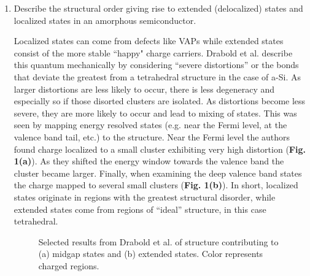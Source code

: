 \documentclass[12pt]{elsarticle}
\newcommand{\vs}{\vspace{2mm}}
\newcommand{\fullline}{\noindent\rule{14cm}{0.4pt} \vspace{4mm}}
\begin{document}
\begin{enumerate}
\fullline
\item Describe the structural order giving rise to extended (delocalized) states and localized states in an amorphous semiconductor. \par \vs 

Localized states can come from defects like VAPs while extended states consist of the more stable ``happy" charge carriers. Drabold et al. \cite{Drabold2000} describe this quantum mechanically by considering ``severe distortions'' or the bonds that deviate the greatest from a tetrahedral structure in the case of a-Si. As larger distortions are less likely to occur, there is less degeneracy and especially so if those disorted clusters are isolated. As distortions become less severe, they are more likely to occur and lead to mixing of states. This was seen by mapping energy resolved states (e.g. near the Fermi level, at the valence band tail, etc.) to the structure. Near the Fermi level the authors found charge localized to a small cluster exhibiting very high distortion (\textbf{Fig. 1(a)}). As they shifted the energy window towards the valence band the cluster became larger. Finally, when examining the deep valence band states the charge mapped to several small clusters (\textbf{Fig. 1(b)}). In short, localized states originate in regions with the greatest structural disorder, while extended states come from regions of ``ideal'' structure, in this case tetrahedral.
\begin{figure}
	\hfill
	\hfill
	\hfill
	\caption{Selected results from Drabold et al. \cite{Drabold2000} of structure contributing to (a) midgap states and (b) extended states. Color represents charged regions.}
\end{figure}


\end{enumerate}
\end{document}
